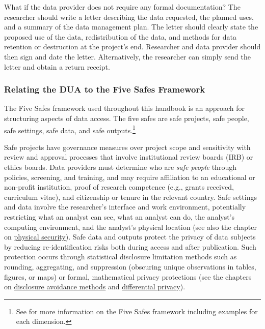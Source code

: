 \documentclass[
]{WileySix}
\begin{document}
\begin{bbox}
\begin{bbox}

What if the data provider does not require any formal documentation? The researcher should write a letter describing the data requested, the planned uses, and a summary of the data management plan. The letter should clearly state the proposed use of the data, redistribution of the data, and methods for data retention or destruction at the project's end. Researcher and data provider should then sign and date the letter. Alternatively, the researcher can simply send the letter and obtain a return receipt.

\end{bbox}
\end{bbox}

\hypertarget{relating-the-dua-to-the-five-safes-framework}{%
\subsubsection{Relating the DUA to the Five Safes Framework}\label{relating-the-dua-to-the-five-safes-framework}}

The Five Safes framework used throughout this handbook is an approach for structuring aspects of data access. The five safes are safe projects, safe people, safe settings, safe data, and safe outputs.\footnote{See \citet{desai2016} for more information on the Five Safes framework including examples for each dimension.}

Safe projects have governance measures over project scope and sensitivity with review and approval processes that involve institutional review boards (IRB) or ethics boards. Data providers must determine who are \emph{safe people} through policies, screening, and training, and may require affiliation to an educational or non-profit institution, proof of research competence (e.g., grants received, curriculum vitae), and citizenship or tenure in the relevant country. Safe settings and data involve the researcher's interface and work environment, potentially restricting what an analyst can see, what an analyst can do, the analyst's computing environment, and the analyst's physical location (see also the chapter on \protect\hyperlink{security}{physical security}). Safe data and outputs protect the privacy of data subjects by reducing re-identification risks both during access and after publication. Such protection occurs through statistical disclosure limitation methods such as rounding, aggregating, and suppression (obscuring unique observations in tables, figures, or maps) or formal, mathematical privacy protections (see the chapters on \protect\hyperlink{discavoid}{disclosure avoidance methods} and \protect\hyperlink{diffpriv}{differential privacy}).
\end{document}
